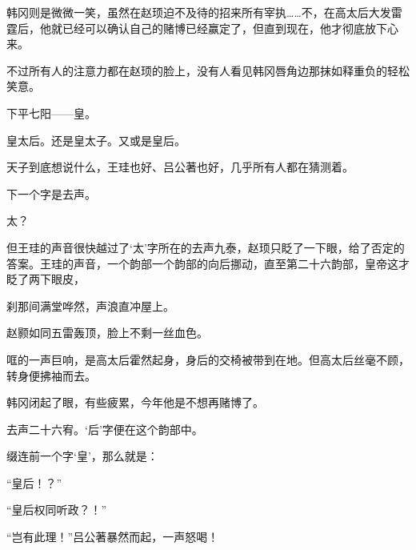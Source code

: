 韩冈则是微微一笑，虽然在赵顼迫不及待的招来所有宰执……不，在高太后大发雷霆后，他就已经可以确认自己的赌博已经赢定了，但直到现在，他才彻底放下心来。 

不过所有人的注意力都在赵顼的脸上，没有人看见韩冈唇角边那抹如释重负的轻松笑意。 

下平七阳——皇。 

皇太后。还是皇太子。又或是皇后。 

天子到底想说什么，王珪也好、吕公著也好，几乎所有人都在猜测着。 

下一个字是去声。 

太？ 

但王珪的声音很快越过了‘太’字所在的去声九泰，赵顼只眨了一下眼，给了否定的答案。王珪的声音，一个韵部一个韵部的向后挪动，直至第二十六韵部，皇帝这才眨了两下眼皮， 

刹那间满堂哗然，声浪直冲屋上。 

赵颢如同五雷轰顶，脸上不剩一丝血色。 

哐的一声巨响，是高太后霍然起身，身后的交椅被带到在地。但高太后丝毫不顾，转身便拂袖而去。 

韩冈闭起了眼，有些疲累，今年他是不想再赌博了。 

去声二十六宥。‘后’字便在这个韵部中。 

缀连前一个字‘皇’，那么就是： 

“皇后！？” 

“皇后权同听政？！” 

“岂有此理！”吕公著暴然而起，一声怒喝！ 

